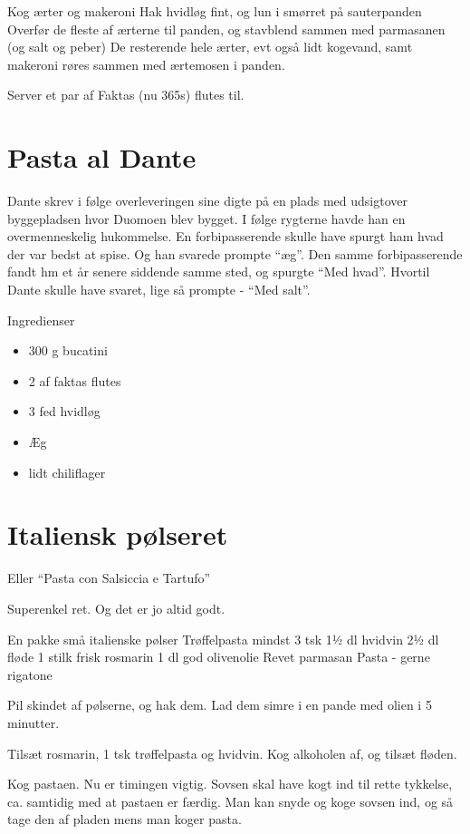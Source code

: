 \documentclass[
  letterpaper,
  DIV=11,
  numbers=noendperiod]{scrreprt}
\providecommand{\tightlist}{%
  \setlength{\itemsep}{0pt}\setlength{\parskip}{0pt}}\usepackage{longtable,booktabs,array}
\begin{document}
Kog ærter og makeroni Hak hvidløg fint, og lun i smørret på sauterpanden
Overfør de fleste af ærterne til panden, og stavblend sammen med
parmasanen (og salt og peber) De resterende hele ærter, evt også lidt
kogevand, samt makeroni røres sammen med ærtemosen i panden.

Server et par af Faktas (nu 365s) flutes til.

\hypertarget{pasta-al-dante}{%
\section{Pasta al Dante}\label{pasta-al-dante}}

Dante skrev i følge overleveringen sine digte på en plads med udsigtover
byggepladsen hvor Duomoen blev bygget. I følge rygterne havde han en
overmenneskelig hukommelse. En forbipasserende skulle have spurgt ham
hvad der var bedst at spise. Og han svarede prompte ``æg''. Den samme
forbipasserende fandt hm et år senere siddende samme sted, og spurgte
``Med hvad''. Hvortil Dante skulle have svaret, lige så prompte - ``Med
salt''.

Ingredienser

\begin{itemize}
\tightlist
\item
  300 g bucatini
\item
  2 af faktas flutes
\item
  3 fed hvidløg
\item
  Æg
\item
  lidt chiliflager
\end{itemize}

\hypertarget{italiensk-puxf8lseret}{%
\section{Italiensk pølseret}\label{italiensk-puxf8lseret}}

Eller ``Pasta con Salsiccia e Tartufo''

Superenkel ret. Og det er jo altid godt.

En pakke små italienske pølser Trøffelpasta mindst 3 tsk 1½ dl hvidvin
2½ dl fløde 1 stilk frisk rosmarin 1 dl god olivenolie Revet parmasan
Pasta - gerne rigatone

Pil skindet af pølserne, og hak dem. Lad dem simre i en pande med olien
i 5 minutter.

Tilsæt rosmarin, 1 tsk trøffelpasta og hvidvin. Kog alkoholen af, og
tilsæt fløden.

Kog pastaen. Nu er timingen vigtig. Sovsen skal have kogt ind til rette
tykkelse, ca. samtidig med at pastaen er færdig. Man kan snyde og koge
sovsen ind, og så tage den af pladen mens man koger pasta.
\end{document}
